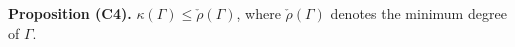 \textbf{Proposition (C4).} $\kappa(\Gamma) \leq \check{\rho}(\Gamma)$, where $\check{\rho}(\Gamma)$ denotes the minimum degree of $\Gamma$.
